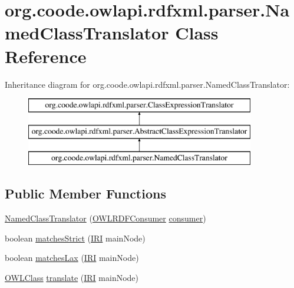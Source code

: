 \hypertarget{classorg_1_1coode_1_1owlapi_1_1rdfxml_1_1parser_1_1_named_class_translator}{\section{org.\-coode.\-owlapi.\-rdfxml.\-parser.\-Named\-Class\-Translator Class Reference}
\label{classorg_1_1coode_1_1owlapi_1_1rdfxml_1_1parser_1_1_named_class_translator}
}
Inheritance diagram for org.\-coode.\-owlapi.\-rdfxml.\-parser.\-Named\-Class\-Translator\-:\begin{figure}[H]
\begin{center}
\leavevmode
\includegraphics[height=3.000000cm]{classorg_1_1coode_1_1owlapi_1_1rdfxml_1_1parser_1_1_named_class_translator}
\end{center}
\end{figure}
\subsection*{Public Member Functions}
\begin{DoxyCompactItemize}
\item 
\hyperlink{classorg_1_1coode_1_1owlapi_1_1rdfxml_1_1parser_1_1_named_class_translator_a34e46a6f3145b3f1d37cea64f6fda39b}{Named\-Class\-Translator} (\hyperlink{classorg_1_1coode_1_1owlapi_1_1rdfxml_1_1parser_1_1_o_w_l_r_d_f_consumer}{O\-W\-L\-R\-D\-F\-Consumer} \hyperlink{classorg_1_1coode_1_1owlapi_1_1rdfxml_1_1parser_1_1_abstract_class_expression_translator_ae547084cdd5b92c03835b5aa404f823b}{consumer})
\item 
boolean \hyperlink{classorg_1_1coode_1_1owlapi_1_1rdfxml_1_1parser_1_1_named_class_translator_ae17d72c682443f5300684b643dd59212}{matches\-Strict} (\hyperlink{classorg_1_1semanticweb_1_1owlapi_1_1model_1_1_i_r_i}{I\-R\-I} main\-Node)
\item 
boolean \hyperlink{classorg_1_1coode_1_1owlapi_1_1rdfxml_1_1parser_1_1_named_class_translator_abcb8f86a1865d0b7adc087798748f16d}{matches\-Lax} (\hyperlink{classorg_1_1semanticweb_1_1owlapi_1_1model_1_1_i_r_i}{I\-R\-I} main\-Node)
\item 
\hyperlink{interfaceorg_1_1semanticweb_1_1owlapi_1_1model_1_1_o_w_l_class}{O\-W\-L\-Class} \hyperlink{classorg_1_1coode_1_1owlapi_1_1rdfxml_1_1parser_1_1_named_class_translator_aa49250faebcab0ac5ed2fb3ae07f1396}{translate} (\hyperlink{classorg_1_1semanticweb_1_1owlapi_1_1model_1_1_i_r_i}{I\-R\-I} main\-Node)
\end{DoxyCompactItemize}

